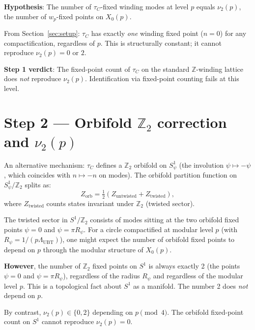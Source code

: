 \documentclass[12pt,a4paper]{article}
\begin{document}
\textbf{Hypothesis}: The number of $\tau_C$-fixed winding modes at level $p$
equals $\nu_2(p)$, the number of $w_p$-fixed points on $X_0(p)$.

From Section~\ref{sec:setup}: $\tau_C$ has exactly \emph{one} winding fixed
point ($n=0$) for any compactification, regardless of $p$.
This is structurally constant; it cannot reproduce $\nu_2(p) = 0$ or $2$.

\textbf{Step 1 verdict}: The fixed-point count of $\tau_C$ on the standard
$\mathbb{Z}$-winding lattice does \emph{not} reproduce $\nu_2(p)$.
Identification via fixed-point counting fails at this level.

\section{Step 2 — Orbifold $\mathbb{Z}_2$ correction and $\nu_2(p)$}
\label{sec:step2}

An alternative mechanism: $\tau_C$ defines a $\mathbb{Z}_2$ orbifold on $S^1_\psi$
(the involution $\psi \mapsto -\psi$, which coincides with $n \mapsto -n$ on modes).
The orbifold partition function on $S^1_\psi / \mathbb{Z}_2$ splits as:
\begin{equation}
  Z_{\mathrm{orb}} = \tfrac{1}{2}(Z_{\mathrm{untwisted}} + Z_{\mathrm{twisted}}),
\end{equation}
where $Z_{\mathrm{twisted}}$ counts states invariant under $\mathbb{Z}_2$ (twisted sector).

The twisted sector in $S^1/\mathbb{Z}_2$ consists of modes sitting at the two
orbifold fixed points $\psi = 0$ and $\psi = \pi R_\psi$.
For a circle compactified at modular level $p$ (with $R_\psi = 1/(p\Lambda_{\mathrm{UBT}})$),
one might expect the number of orbifold fixed points to depend on $p$ through
the modular structure of $X_0(p)$.

\textbf{However}, the number of $\mathbb{Z}_2$ fixed points on $S^1$ is always
exactly 2 (the points $\psi = 0$ and $\psi = \pi R_\psi$), regardless of the
radius $R_\psi$ and regardless of the modular level $p$.  This is a topological
fact about $S^1$ as a manifold.  The number 2 does \emph{not} depend on $p$.

By contrast, $\nu_2(p) \in \{0, 2\}$ depending on $p \pmod{4}$.
The orbifold fixed-point count on $S^1$ cannot reproduce $\nu_2(p) = 0$.
\end{document}
